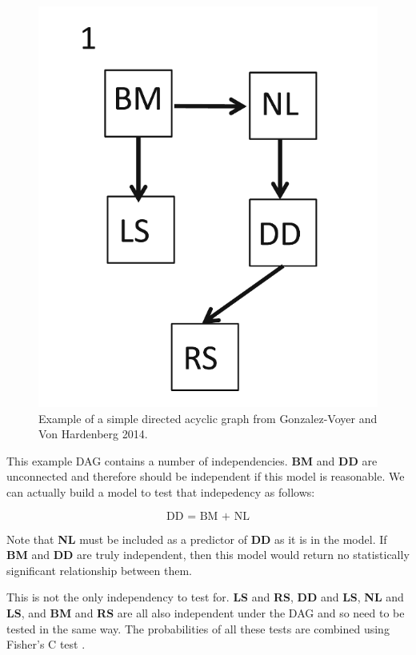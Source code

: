 \documentclass[
]{book}
\begin{document}
\begin{figure}[H]

{\centering \includegraphics[width=7.94in]{Images/DAG1} 

}

\caption{Example of a simple directed acyclic graph from Gonzalez-Voyer and Von Hardenberg 2014.}\label{fig:unnamed-chunk-299}
\end{figure}

This example DAG contains a number of independencies. \textbf{BM} and \textbf{DD} are unconnected and therefore should be independent if this model is reasonable. We can actually build a model to test that indepedency as follows:

\[ \text{DD = BM + NL}\]

Note that \textbf{NL} must be included as a predictor of \textbf{DD} as it is in the model. If \textbf{BM} and \textbf{DD} are truly independent, then this model would return no statistically significant relationship between them.

This is not the only independency to test for. \textbf{LS} and \textbf{RS}, \textbf{DD} and \textbf{LS}, \textbf{NL} and \textbf{LS}, and \textbf{BM} and \textbf{RS} are all also independent under the DAG and so need to be tested in the same way. The probabilities of all these tests are combined using Fisher's C test \citep{Shipley16}.
\end{document}
